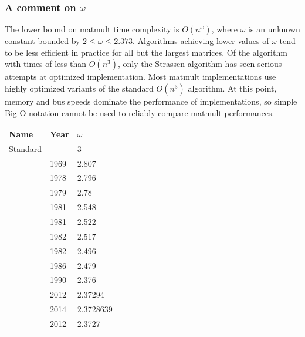 \subsubsection{A comment on $\omega$}

The lower bound on matmult time complexity is $O(n^\omega)$, where $\omega$ is an unknown constant bounded by $2\le\omega\le2.373$. Algorithms achieving lower values of $\omega$ tend to be less efficient in practice for all but the largest matrices. Of the algorithm with times of less than $O(n^3)$, only the Strassen algorithm has seen serious attempts at optimized implementation. Most matmult implementations use highly optimized variants of the standard $O(n^3)$ algorithm. At this point, memory and bus speeds dominate the performance of implementations, so simple Big-O notation cannot be used to reliably compare matmult performances.

\begin{center}
\begin{tabular}{lll}
\textbf{Name}           & \textbf{Year} & $\omega$  \\
Standard                & -             & 3         \\
\citet{Strassen1969}    & 1969          & 2.807     \\
\citet{Pan1978}         & 1978          & 2.796     \\
\citet{Bini1979}        & 1979          & 2.78      \\
\citet{Schonhage1981}   & 1981          & 2.548     \\
\citet{Schonhage1981}   & 1981          & 2.522     \\
\citet{Romani1982}      & 1982          & 2.517     \\
\citet{Coppersmith1982} & 1982          & 2.496     \\
\citet{Strassen1986}    & 1986          & 2.479     \\
\citet{Copper1990}      & 1990          & 2.376     \\
\citet{Williams2012}    & 2012          & 2.37294   \\
\citet{LeGall2014}      & 2014          & 2.3728639 \\
\citet{Williams2012}    & 2012          & 2.3727    \\
\end{tabular}
\end{center}